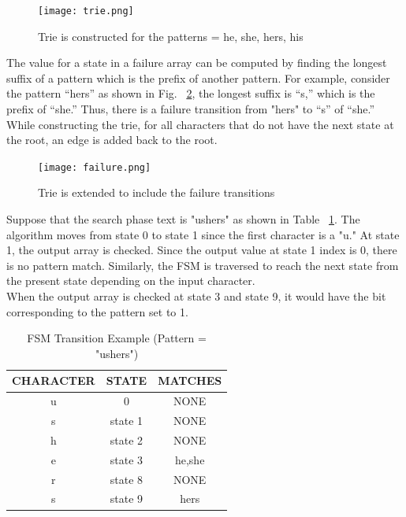 \begin{figure}[H]
	\centering
	\texttt{[image: trie.png]}
	\caption{Trie is constructed for the patterns = {he, she, hers, his}}
	\label{fig:trie}
\end{figure}
\squeezeup

The value for a state in a failure array can be computed by finding the longest suffix of a pattern which is the prefix of another pattern. For example, consider the pattern “hers” as shown in Fig. ~\ref{fig:failure}, the longest suffix is “s,” which is the prefix of “she.” Thus, there is a failure transition from "hers" to “s” of “she.” While constructing the trie, for all characters that do not have the next state at the root, an edge is added back to the root. 

\begin{figure}[H]
	\centering
	\texttt{[image: failure.png]}
	\caption{Trie is extended to include the failure transitions}
	\label{fig:failure}
\end{figure}
\squeezeup

Suppose that the search phase text is "ushers" as shown in Table ~\ref{tab:search}. The algorithm moves from state 0 to state 1 since the first character is a "u." At state 1, the output array is checked. Since the output value at state 1 index is 0, there is no pattern match. Similarly, the FSM is traversed to reach the next state from the present state depending on the input character. \\ When the output array is checked at state 3 and state 9, it would have the bit corresponding to the pattern set to 1.

\begin {table}[H]
\centering
\caption {FSM Transition Example (Pattern = "ushers")} \label{tab:search}
	\begin{tabular}{|c|c|c|}
	\midrule
	CHARACTER & STATE & MATCHES\\
	\midrule
	u & 0 & NONE\\
	\midrule
	s & state 1 &  NONE\\
	\midrule
	h & state 2 & NONE\\
	\midrule
	e & state 3 & {he,she}\\
	\midrule
	r & state 8 & NONE\\
	\midrule
	s & state 9 & {hers}\\
	\midrule
\end{tabular}
\end{table}
\squeezeup

